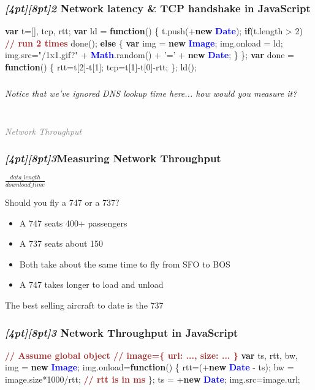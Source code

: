 \documentclass{beamer}
\newcommand{\sn}[1]{\textrm{\textit{\Huge{\raisebox{-3pt}[4pt][8pt]{\textcolor{f2elblue}{#1}}}}}\hspace{4pt}}
\newcommand{\innersplash}[1]{
  \begin{center}
    \large \textrm{\textit{ #1 } }
  \end{center}
}
\newcommand{\splashslide}[2][{}]{
  \begin{frame}
  \frametitle{#1}
  \innersplash{#2}
  \end{frame}
}
\newcommand{\leadinslide}[2]{
  \splashslide{
     {\fontsize{150}{20}\selectfont{\raisebox{0pt}[90pt][0pt]{\textcolor{light-gray}{#1}}}} \\ \huge \textcolor{gray}{#2}
  }
}
\def\brown<#1>#2{\textcolor<#1>{brown}{\textbf<#1>{#2}}}
\def\green<#1>#2{\textcolor<#1>{dark-green}{\textbf<#1>{#2}}}
\def\blue<#1>#2{\textcolor<#1>{blue}{\textbf<#1>{#2}}}
\begin{document}
\begin{frame}[fragile]
\frametitle{\sn{2} Network latency \& TCP handshake in JavaScript}
\vspace{-.3cm}
\begin{semiverbatim}
\green<1>{var} t=[], tcp, rtt;
\green<1>{var} ld = \green<1>{function}() \{
   t.push(+\green<1>{new} \blue<1>{Date});
   \green<1>{if}(t.length > 2)  \brown<1>{// run 2 times}
     done();
   \green<1>{else} \{
     \green<1>{var} img = \green<1>{new} \blue<1>{Image};
     img.onload = ld;
     img.src="/1x1.gif?" + \blue<1>{Math}.random()
                         + '=' + \green<1>{new} \blue<1>{Date};
   \}
\};
\green<1>{var} done = \green<1>{function}() \{
  rtt=t[2]-t[1];
  tcp=t[1]-t[0]-rtt;
\};
ld();
\end{semiverbatim}
\end{frame}

\splashslide{Notice that we've ignored DNS lookup time here... how would you measure it?}

\leadinslide{3}{Network Throughput}

\splashslide[\sn{3}Measuring Network Throughput]{\LARGE{\( \frac{data\_length}{download\_time} \)}}

\begin{frame}{Should you fly a 747 or a 737?}
  \begin{itemize}
  \item A 747 seats 400+ passengers
  \item A 737 seats about 150
  \item Both take about the same time to fly from SFO to BOS
  \item A 747 takes longer to load and unload
  \end{itemize}
  \vfill
  \tiny{The best selling aircraft to date is the 737}
\end{frame}

\begin{frame}[fragile]
\frametitle{\sn{3} Network Throughput in JavaScript}
\begin{semiverbatim}
\brown<1>{// Assume global object
// image=\{ url: ..., size: ... \}}
\green<1>{var} ts, rtt, bw, img = \green<1>{new} \blue<1>{Image};
img.onload=\green<1>{function}() \{
   rtt=(+\green<1>{new} \blue<1>{Date} - ts);
   bw = image.size*1000/rtt;    \brown<1>{// rtt is in ms}
\};
ts = +\green<1>{new} \blue<1>{Date};
img.src=image.url;
\end{semiverbatim}
\end{frame}
\end{document}

